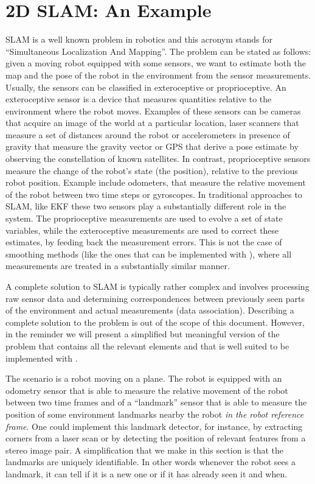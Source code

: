 \documentclass[a4paper]{article}
\begin{document}
\section{2D SLAM: An Example}
SLAM is a well known problem in robotics and this acronym stands for
``Simultaneous Localization And Mapping''. The problem can be stated
as follows: given a moving robot equipped with some sensors, we want
to estimate both the map and the pose of the robot in the environment
from the sensor measurements. Usually, the sensors can be classified
in exteroceptive or proprioceptive.  An exteroceptive sensor is a
device that measures quantities relative to the environment where the
robot moves.  Examples of these sensors can be cameras that acquire an
image of the world at a particular location, laser scanners that
measure a set of distances around the robot or accelerometers in
presence of gravity that measure the gravity vector or GPS that derive
a pose estimate by observing the constellation of known satellites.
In contrast, proprioceptive sensors measure the change of the robot's
state (the position), relative to the previous robot position. Example
include odometers, that measure the relative movement of the robot
between two time steps or gyroscopes. In traditional approaches to
SLAM, like EKF these two sensors play a substantially different role
in the system.  The proprioceptive measurements are used to evolve a
set of state variables, while the exteroceptive measurements are used
to correct these estimates, by feeding back the measurement errors.
This is not the case of smoothing methods (like the ones that can be
implemented with \gopt{}), where all measurements are treated in a
substantially similar manner.

A complete solution to SLAM is typically rather complex and involves
processing raw sensor data and determining correspondences between
previously seen parts of the environment and actual measurements (data
association). Describing a complete solution to the problem is out of
the scope of this document.  However, in the reminder we will present a
simplified but meaningful version of the problem that contains all the relevant elements
and that is well suited to be implemented with \gopt.

The scenario is a robot moving on a plane. The robot is equipped
with an odometry sensor that is able to measure the relative movement
of the robot between two time frames and of a ``landmark'' sensor
that is able to measure the position of some environment landmarks
nearby the robot \emph{in the robot reference frame}. One could
implement this landmark detector, for instance, by extracting corners
from a laser scan or by detecting the position of relevant features
from a stereo image pair. A simplification that we make in this
section is that the landmarks are uniquely identifiable. In other
words whenever the robot sees a landmark, it can tell if it is a new
one or if it has already seen it and when.
\end{document}
